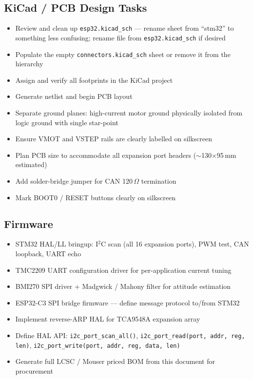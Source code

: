 \documentclass[11pt,a4paper]{article}
\begin{document}
\subsection{KiCad / PCB Design Tasks}

\begin{itemize}
  \item Review and clean up \texttt{esp32.kicad\_sch} --- rename sheet from ``stm32'' to something less confusing; rename file from \texttt{esp32.kicad\_sch} if desired
  \item Populate the empty \texttt{connectors.kicad\_sch} sheet or remove it from the hierarchy
  \item Assign and verify all footprints in the KiCad project
  \item Generate netlist and begin PCB layout
  \item Separate ground planes: high-current motor ground physically isolated from logic ground with single star-point
  \item Ensure VMOT and VSTEP rails are clearly labelled on silkscreen
  \item Plan PCB size to accommodate all expansion port headers ($\sim$130$\times$95\,mm estimated)
  \item Add solder-bridge jumper for CAN 120\,$\Omega$ termination
  \item Mark BOOT0 / RESET buttons clearly on silkscreen
\end{itemize}

\subsection{Firmware}

\begin{itemize}
  \item STM32 HAL/LL bringup: I$^2$C scan (all 16 expansion ports), PWM test, CAN loopback, UART echo
  \item TMC2209 UART configuration driver for per-application current tuning
  \item BMI270 SPI driver + Madgwick / Mahony filter for attitude estimation
  \item ESP32-C3 SPI bridge firmware --- define message protocol to/from STM32
  \item Implement reverse-ARP HAL for TCA9548A expansion array
  \item Define HAL API: \texttt{i2c\_port\_scan\_all()}, \texttt{i2c\_port\_read(port, addr, reg, len)}, \texttt{i2c\_port\_write(port, addr, reg, data, len)}
  \item Generate full LCSC / Mouser priced BOM from this document for procurement
\end{itemize}
\end{document}
